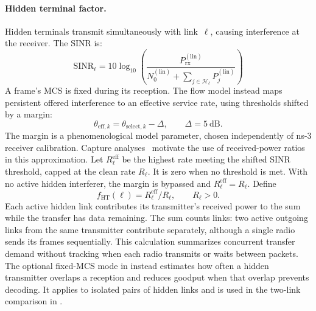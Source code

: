 \documentclass[conference]{IEEEtran}
\begin{document}
\paragraph{Hidden terminal factor.}
Hidden terminals transmit simultaneously with link~$\ell$, causing
interference at the receiver.  The SINR is:
\begin{equation}
\text{SINR}_\ell = 10\log_{10}\!\left(\frac{P_\text{rx}^{(\text{lin})}}{N_0^{(\text{lin})} + \sum_{j \in \mathcal{H}_\ell} P_j^{(\text{lin})}}\right)
\label{eq:sinr}
\end{equation}
A frame's MCS is fixed during its reception. The flow model instead maps
persistent offered interference to an effective service rate, using
thresholds shifted by a margin:
\begin{equation}
\theta_{\mathrm{eff},k}=\theta_{\mathrm{select},k}-\Delta,
\qquad \Delta=5\ \mathrm{dB}.
\label{eq:capture}
\end{equation}
The margin is a phenomenological model parameter, chosen independently
of ns-3 receiver calibration. Capture analyses~\cite{daneshgaran2008,zorzi1994,hadzivelkov2002}
motivate the use of received-power ratios in this approximation.
Let $R_\ell^{\mathrm{eff}}$ be the highest rate meeting the shifted SINR
threshold, capped at the clean rate $R_\ell$. It is zero when no threshold
is met. With no active hidden interferer, the margin is bypassed and
$R_\ell^{\mathrm{eff}}=R_\ell$. Define
\begin{equation}
f_\mathrm{HT}(\ell)=R_\ell^{\mathrm{eff}}/R_\ell,\qquad R_\ell>0.
\label{eq:sinr_factor}
\end{equation}
Each active hidden link contributes its transmitter's received power to
the sum while the transfer has data remaining. The sum counts links:
two active outgoing links from the same transmitter contribute separately,
although a single radio sends its frames sequentially. This calculation
summarizes concurrent transfer demand without tracking when each radio
transmits or waits between packets. The optional fixed-MCS mode in
 instead estimates how often a hidden transmitter
overlaps a reception and reduces goodput when that overlap prevents
decoding. It applies to isolated pairs of hidden links and is used in
the two-link comparison in .
\end{document}

